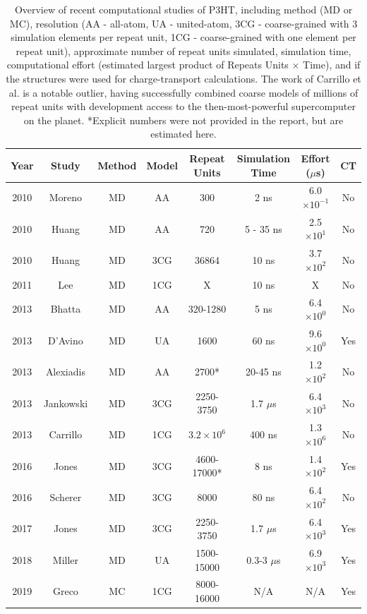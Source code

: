 \begin{landscape}
\begin{table}
    \caption{Overview of recent computational studies of P3HT, including method (MD or MC), resolution (AA - all-atom, UA - united-atom, 3CG - coarse-grained with 3 simulation elements per repeat unit, 1CG - coarse-grained with one element per repeat unit), approximate number of repeat units simulated, simulation time, computational effort (estimated largest product of Repeats Units $\times$ Time), and if the structures were used for charge-transport calculations. 
    The work of Carrillo et al.\cite{Carrillo2013} is a notable outlier, having successfully combined coarse models of millions of repeat units with development access to the then-most-powerful supercomputer on the planet.
    *Explicit numbers were not provided in the report, but are estimated here.}
\centering
\begin{tabular}{|c|c|c|c|c|c|c|c|}
\hline
    Year & Study & Method & Model & Repeat Units & Simulation Time & Effort ($\mu$s)  & CT \\
\hline
    2010 & Moreno\cite{Moreno2010} & MD & AA & 300 & 2 ns & 6.0$\times 10^{-1}$  & No \\%
\hline
    2010 & Huang\cite{Huang2010} & MD & AA & 720 & 5 - 35 ns & 2.5$\times 10^{1}$  & No \\
\hline
    2010 & Huang\cite{Huang2010} & MD & 3CG & 36864 & 10 ns & 3.7$\times 10^{2}$  & No \\
\hline
    2011 & Lee\cite{Lee2011} & MD & 1CG & X & 10 ns & X  & No \\
\hline
    2013 & Bhatta\cite{Bhatta2013a} & MD & AA & 320-1280 & 5 ns & 6.4$\times 10^{0}$  & No \\%
\hline
    2013 & D'Avino\cite{DAvino2013} & MD & UA & 1600 & 60 ns & 9.6$\times 10^{0}$  & Yes \\
\hline
    2013 & Alexiadis\cite{Alexiadis2013} & MD & AA & 2700* & 20-45 ns & 1.2$\times 10^{2}$ & No \\
\hline
    2013 & Jankowski\cite{Jankowski2013} & MD & 3CG & 2250-3750 & 1.7 $\mu$s & 6.4$\times 10^{3}$  & No \\
\hline
    2013 & Carrillo\cite{Carrillo2013} & MD & 1CG & $3.2 \times 10^{6}$ & 400 ns & 1.3$\times 10^{6}$ & No \\
\hline
    2016 & Jones\cite{Jones2016} & MD & 3CG & 4600-17000* & 8 ns & 1.4$\times 10^{2}$  & Yes \\
\hline
    2016 & Scherer\cite{Scherer2016} & MD & 3CG & 8000 & 80 ns & 6.4$\times 10^{2}$  & No \\
\hline
    2017 & Jones\cite{Jones2017} & MD & 3CG & 2250-3750 & 1.7 $\mu$s & 6.4$\times 10^{3}$  & Yes \\
\hline
    2018 & Miller\cite{Miller2018, Miller2018a} & MD & UA & 1500-15000 & 0.3-3 $\mu$s & 6.9$\times 10^{3}$  & Yes \\
\hline
    2019 & Greco\cite{Greco2019} & MC & 1CG & 8000-16000 & N/A & N/A  & Yes \\
\hline
\end{tabular}
\label{table:p3ht-simulations}
\end{table}
\end{landscape}

